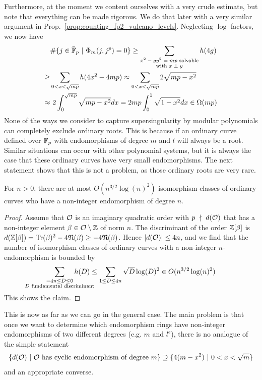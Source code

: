 Furthermore, at the moment we content ourselves with a very crude estimate, but note that everything can be made rigorous.
We do that later with a very similar argument in Prop.~\ref{prop:counting_fp2_vulcano_levels}.
Neglecting $\log$-factors, we now have
\begin{align*}
    &\#\{ j \in \bar{\mathbb{F}}_p \ | \ \Phi_m(j, j^p) = 0 \} \geq \sum_{\substack{\text{$x^2 - gy^2 = mp$ solvable}\\\text{with $x \perp y$}}} h(4g) \\
    \geq& \sum_{0 < x < \sqrt{mp}} h(4x^2 - 4m p) \approx \sum_{0 < x < \sqrt{mp}} 2\sqrt{mp - x^2} \\
    \approx& \ 2\int_0^{\sqrt{mp}} \sqrt{mp - x^2} dx = 2mp \int_0^1 \sqrt{1 - x^2} dx \in \Omega(m p)
\end{align*}
None of the ways we consider to capture supersingularity by modular polynomials can completely exclude ordinary roots.
This is because if an ordinary curve defined over $\mathbb{F}_p$ with endomorphisms of degree $m$ and $l$ will always be a root.
Similar situations can occur with other polynomial systems, but it is always the case that these ordinary curves have very small endomorphisms.
The next statement shows that this is not a problem, as those ordinary roots are very rare.
\begin{prop}
    \label{prop:small_endomorphism_rare}
    For $n > 0$, there are at most $O(n^{3/2}\log(n)^2)$ isomorphism classes of ordinary curves who have a non-integer endomorphism of degree $n$.
\end{prop}
\begin{proof}
    Assume that $\mathcal{O}$ is an imaginary quadratic order with $p \ \nmid \  d(\mathcal{O})$ that has a non-integer element $\beta \in \mathcal{O} \setminus \mathbb{Z}$ of norm $n$.
    The discriminant of the order $\mathbb{Z}[\beta]$ is $d(\mathbb{Z}[\beta]) = \mathrm{Tr}(\beta)^2 - 4\mathfrak{N}(\beta) \geq -4\mathfrak{N}(\beta)$.
    Hence $|d(\mathcal{O})| \leq 4n$, and we find that the number of isomorphism classes of ordinary curves with a non-integer $n$-endomorphism is bounded by
    \begin{align*}
        \sum_{\substack{-4n \leq D \leq 0\\\mathclap{\text{$D$ fundamental discriminant}}}} h(D) \leq \sum_{1 \leq D \leq 4n} \sqrt{D}\log(D)^2 \in O(n^{3/2}\log(n)^2)
    \end{align*}
    This shows the claim.
\end{proof}
This is now as far as we can go in the general case.
The main problem is that once we want to determine which endomorphism rings have non-integer endomorphisms of two different degrees (e.g. $m$ and $l^e$), there is no analogue of the simple statement
\begin{equation*}
    \{ d(\mathcal{O}) \ | \ \text{$\mathcal{O}$ has cyclic endomorphism of degree $m$}\} \supseteq \{ 4(m - x^2) \ | \ 0 < x < \sqrt{m} \}
\end{equation*}
and an appropriate converse.

